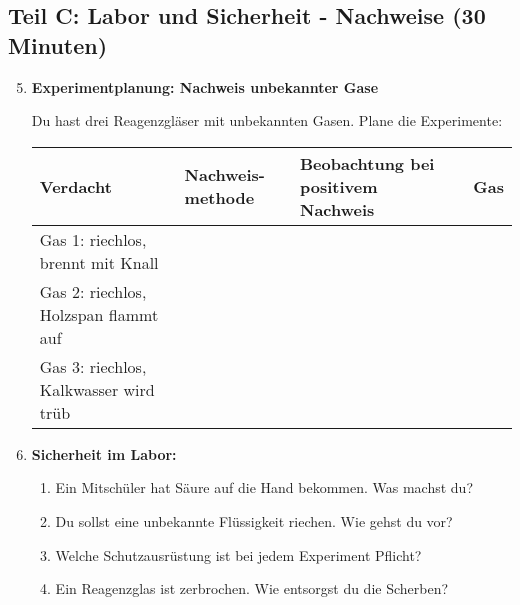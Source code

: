 \subsection*{Teil C: Labor und Sicherheit - Nachweise (30 Minuten)}

\begin{enumerate}[label=\arabic*.]
    \setcounter{enumi}{4}

    \item \textbf{Experimentplanung: Nachweis unbekannter Gase}
    \vspace{0.5cm}

    Du hast drei Reagenzgläser mit unbekannten Gasen. Plane die Experimente:

    \begin{tabular}{|p{3cm}|p{4cm}|p{4cm}|p{3cm}|}
        \hline
        \textbf{Verdacht} & \textbf{Nachweis-methode} & \textbf{Beobachtung bei positivem Nachweis} & \textbf{Gas} \\
        \hline
        Gas 1: riechlos, brennt mit Knall & & & \\[1cm]
        \hline
        Gas 2: riechlos, Holzspan flammt auf & & & \\[1cm]
        \hline
        Gas 3: riechlos, Kalkwasser wird trüb & & & \\[1cm]
        \hline
    \end{tabular}

    \vspace{1cm}

    \item \textbf{Sicherheit im Labor:}
    \vspace{0.5cm}

    \begin{enumerate}[label=\alph*)]
        \item Ein Mitschüler hat Säure auf die Hand bekommen. Was machst du?
        \vspace{1cm}

        \item Du sollst eine unbekannte Flüssigkeit riechen. Wie gehst du vor?
        \vspace{1cm}

        \item Welche Schutzausrüstung ist bei jedem Experiment Pflicht?
        \vspace{1cm}

        \item Ein Reagenzglas ist zerbrochen. Wie entsorgst du die Scherben?
        \vspace{1cm}
    \end{enumerate}


\end{enumerate}
